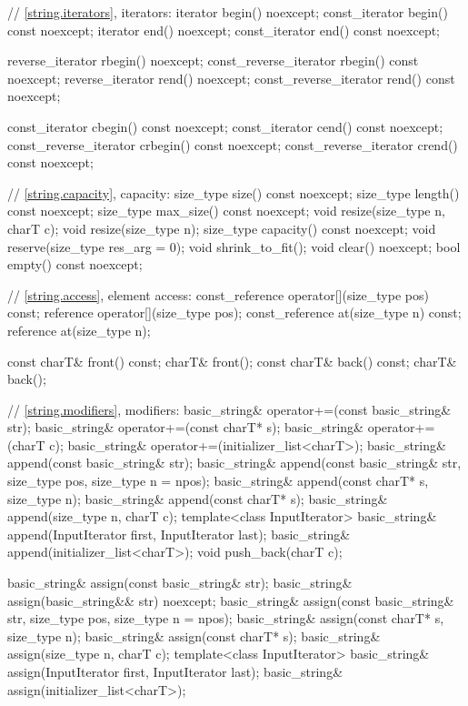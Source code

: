 \begin{codeblock}
{{    // \ref{string.iterators}, iterators:
    iterator       begin() noexcept;
    const_iterator begin() const noexcept;
    iterator       end() noexcept;
    const_iterator end() const noexcept;

    reverse_iterator       rbegin() noexcept;
    const_reverse_iterator rbegin() const noexcept;
    reverse_iterator       rend() noexcept;
    const_reverse_iterator rend() const noexcept;

    const_iterator         cbegin() const noexcept;
    const_iterator         cend() const noexcept;
    const_reverse_iterator crbegin() const noexcept;
    const_reverse_iterator crend() const noexcept;

    // \ref{string.capacity}, capacity:
    size_type size() const noexcept;
    size_type length() const noexcept;
    size_type max_size() const noexcept;
    void resize(size_type n, charT c);
    void resize(size_type n);
    size_type capacity() const noexcept;
    void reserve(size_type res_arg = 0);
    void shrink_to_fit();
    void clear() noexcept;
    bool empty() const noexcept;

    // \ref{string.access}, element access:
    const_reference operator[](size_type pos) const;
    reference       operator[](size_type pos);
    const_reference at(size_type n) const;
    reference       at(size_type n);

    const charT& front() const;
    charT& front();
    const charT& back() const;
    charT& back();

    // \ref{string.modifiers}, modifiers:
    basic_string& operator+=(const basic_string& str);
    basic_string& operator+=(const charT* s);
    basic_string& operator+=(charT c);
    basic_string& operator+=(initializer_list<charT>);
    basic_string& append(const basic_string& str);
    basic_string& append(const basic_string& str, size_type pos,
                         size_type n = npos);
    basic_string& append(const charT* s, size_type n);
    basic_string& append(const charT* s);
    basic_string& append(size_type n, charT c);
    template<class InputIterator>
      basic_string& append(InputIterator first, InputIterator last);
    basic_string& append(initializer_list<charT>);
    void push_back(charT c);

    basic_string& assign(const basic_string& str);
    basic_string& assign(basic_string&& str) noexcept;
    basic_string& assign(const basic_string& str, size_type pos,
                         size_type n = npos);
    basic_string& assign(const charT* s, size_type n);
    basic_string& assign(const charT* s);
    basic_string& assign(size_type n, charT c);
    template<class InputIterator>
      basic_string& assign(InputIterator first, InputIterator last);
    basic_string& assign(initializer_list<charT>);

}}
\end{codeblock}
